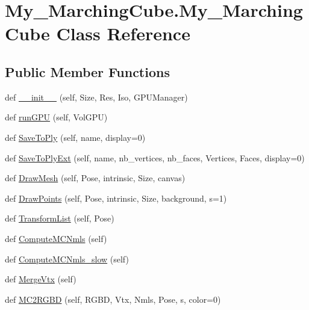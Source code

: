 \hypertarget{class_my___marching_cube_1_1_my___marching_cube}{}\section{My\+\_\+\+Marching\+Cube.\+My\+\_\+\+Marching\+Cube Class Reference}
\label{class_my___marching_cube_1_1_my___marching_cube}
\subsection*{Public Member Functions}
\begin{DoxyCompactItemize}
\item 
def \hyperlink{class_my___marching_cube_1_1_my___marching_cube_a7f2970f295285729918604008fc7809f}{\+\_\+\+\_\+init\+\_\+\+\_\+} (self, Size, Res, Iso, G\+P\+U\+Manager)
\item 
def \hyperlink{class_my___marching_cube_1_1_my___marching_cube_a820edf1a7b295d5e3fbe858bddc03423}{run\+G\+PU} (self, Vol\+G\+PU)
\item 
def \hyperlink{class_my___marching_cube_1_1_my___marching_cube_a9ba8a5429eed6fbbe83798c4988e65f4}{Save\+To\+Ply} (self, name, display=0)
\item 
def \hyperlink{class_my___marching_cube_1_1_my___marching_cube_a9c250e7239f5e6a7f547ee18f0ad6e43}{Save\+To\+Ply\+Ext} (self, name, nb\+\_\+vertices, nb\+\_\+faces, Vertices, Faces, display=0)
\item 
def \hyperlink{class_my___marching_cube_1_1_my___marching_cube_aa6b90ce7e02b9a41c824707630b64f07}{Draw\+Mesh} (self, Pose, intrinsic, Size, canvas)
\item 
def \hyperlink{class_my___marching_cube_1_1_my___marching_cube_a4b28f492fb09edfca2a4814c86631720}{Draw\+Points} (self, Pose, intrinsic, Size, background, s=1)
\item 
def \hyperlink{class_my___marching_cube_1_1_my___marching_cube_a063b11ec768a65b5b73159c6eed61e32}{Transform\+List} (self, Pose)
\item 
def \hyperlink{class_my___marching_cube_1_1_my___marching_cube_a5a1e9c085022497596ba726002435603}{Compute\+M\+C\+Nmls} (self)
\item 
def \hyperlink{class_my___marching_cube_1_1_my___marching_cube_a27d160262d57b10e11ec11978c4fa8ea}{Compute\+M\+C\+Nmls\+\_\+slow} (self)
\item 
def \hyperlink{class_my___marching_cube_1_1_my___marching_cube_a234beb0a06a023ee9d4571d569af755c}{Merge\+Vtx} (self)
\item 
def \hyperlink{class_my___marching_cube_1_1_my___marching_cube_aaf418aa2b8358d872fc53616408acdf6}{M\+C2\+R\+G\+BD} (self, R\+G\+BD, Vtx, Nmls, Pose, s, color=0)
\end{DoxyCompactItemize}

